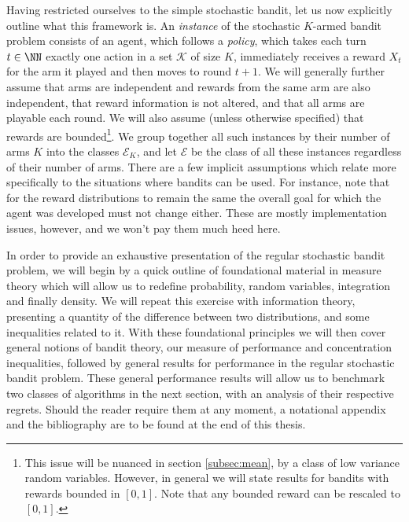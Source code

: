\par Having restricted ourselves to the simple stochastic bandit, let us now explicitly outline what this framework is. An {\em instance} of the stochastic $K$-armed bandit problem consists of an agent, which follows a {\em policy}, which takes each turn $t\in\NN$ exactly one action in a set $\mathcal{K}$ of size $K$, immediately receives a reward $X_t$ for the arm it played and then moves to round $t+1$. We will generally further assume that arms are independent and rewards from the same arm are also independent, that reward information is not altered, and that all arms are playable each round. We will also assume (unless otherwise specified) that rewards are bounded\footnote{This issue will be nuanced in section \ref{subsec:mean}, by a class of low variance random variables. However, in general we will state results for bandits with rewards bounded in $[0,1]$. Note that any bounded reward can be rescaled to $[0,1]$.}. We group together all such instances by their number of arms $K$ into the classes $\mathcal{E}_K$, and let $\mathcal{E}$ be the class of all these instances regardless of their number of arms. There are a few implicit assumptions which relate more specifically to the situations where bandits can be used. For instance, note that for the reward distributions to remain the same the overall goal for which the agent was developed must not change either. These are mostly implementation issues, however, and we won't pay them much heed here. 

\par In order to provide an exhaustive presentation of the regular stochastic bandit problem, we will begin by a quick outline of foundational material in measure theory which will allow us to redefine probability, random variables, integration and finally density. We will repeat this exercise with information theory, presenting a quantity of the difference between two distributions, and some inequalities related to it. With these foundational principles we will then cover general notions of bandit theory, our measure of performance and concentration inequalities, followed by general results for performance in the regular stochastic bandit problem. These general performance results will allow us to benchmark two classes of algorithms in the next section, with an analysis of their respective regrets.  Should the reader require them at any moment, a notational appendix and the bibliography are to be found at the end of this thesis. 
